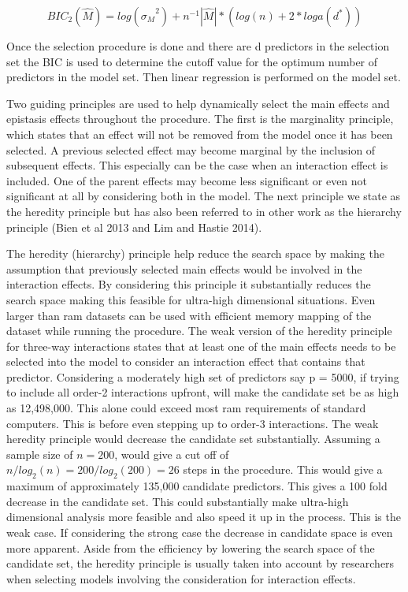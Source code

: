 \documentclass[11pt,]{book}
\theoremstyle{definition}
\theoremstyle{definition}
\theoremstyle{remark}
\begin{document}
\begin{equation}
BIC_2(\hat{M}) = log(\hat{σ_M}^2) + n^{-1} |\hat{M}| * (log(n) + 2*loga(d^*))
\label{eq:bic2}
\end{equation}

Once the selection procedure is done and there are d predictors in the
selection set the BIC is used to determine the cutoff value for the
optimum number of predictors in the model set. Then linear regression is
performed on the model set.

Two guiding principles are used to help dynamically select the main
effects and epistasis effects throughout the procedure. The first is the
marginality principle, which states that an effect will not be removed
from the model once it has been selected. A previous selected effect may
become marginal by the inclusion of subsequent effects. This especially
can be the case when an interaction effect is included. One of the
parent effects may become less significant or even not significant at
all by considering both in the model. The next principle we state as the
heredity principle but has also been referred to in other work as the
hierarchy principle (Bien et al 2013 and Lim and Hastie 2014).

The heredity (hierarchy) principle help reduce the search space by
making the assumption that previously selected main effects would be
involved in the interaction effects. By considering this principle it
substantially reduces the search space making this feasible for
ultra-high dimensional situations. Even larger than ram datasets can be
used with efficient memory mapping of the dataset while running the
procedure. The weak version of the heredity principle for three-way
interactions states that at least one of the main effects needs to be
selected into the model to consider an interaction effect that contains
that predictor. Considering a moderately high set of predictors say p =
5000, if trying to include all order-2 interactions upfront, will make
the candidate set be as high as 12,498,000. This alone could exceed most
ram requirements of standard computers. This is before even stepping up
to order-3 interactions. The weak heredity principle would decrease the
candidate set substantially. Assuming a sample size of \(n = 200\),
would give a cut off of \(n/log_{2}(n) = 200/log_{2}(200) = 26\) steps
in the procedure. This would give a maximum of approximately 135,000
candidate predictors. This gives a 100 fold decrease in the candidate
set. This could substantially make ultra-high dimensional analysis more
feasible and also speed it up in the process. This is the weak case. If
considering the strong case the decrease in candidate space is even more
apparent. Aside from the efficiency by lowering the search space of the
candidate set, the heredity principle is usually taken into account by
researchers when selecting models involving the consideration for
interaction effects.
\end{document}
